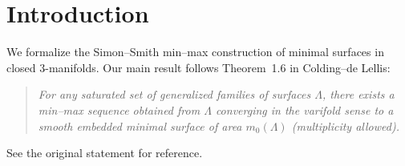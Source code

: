\chapter{Introduction}

We formalize the Simon--Smith min--max construction of minimal surfaces in closed $3$-manifolds.
Our main result follows Theorem~1.6 in Colding--de Lellis:
\begin{quote}
\emph{For any saturated set of generalized families of surfaces $\Lambda$, there exists a min--max sequence obtained from $\Lambda$ converging in the varifold sense to a smooth embedded minimal surface of area $m_0(\Lambda)$ (multiplicity allowed).}
\end{quote}
See the original statement for reference.  \uses{}
